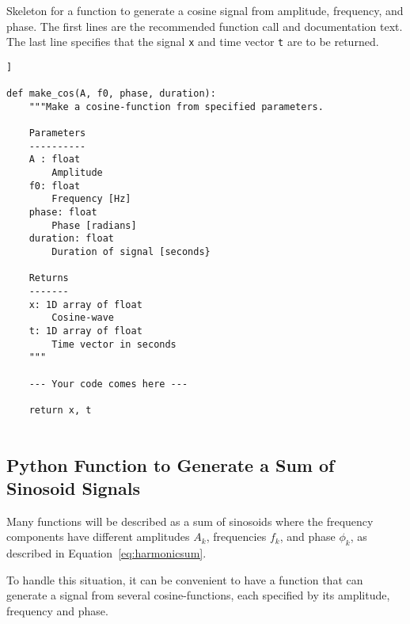 \begin{table}[h!]
	\caption{Skeleton for a function to generate a cosine signal from amplitude, frequency, and phase.
	The first lines are the recommended function call and documentation text. The last line specifies that the signal \texttt{x} and time vector \texttt{t} are to be returned. }
	\label{tab:make-cos}
\begin{lstlisting}[style=pythonstyle]]

def make_cos(A, f0, phase, duration):
	"""Make a cosine-function from specified parameters.
	
	Parameters
	----------
	A : float
		Amplitude
	f0: float
		Frequency [Hz]
	phase: float
		Phase [radians]
	duration: float
		Duration of signal [seconds}
	
	Returns
	-------
	x: 1D array of float
		Cosine-wave
	t: 1D array of float
		Time vector in seconds
	"""
	
	--- Your code comes here ---
	
	return x, t
		
\end{lstlisting}
\end{table}

\subsection{Python Function to Generate a Sum of Sinosoid Signals}
Many functions will be described as a sum of sinosoids where the frequency components have different amplitudes $A_k$, frequencies $f_k$, and phase $\phi_k$, as described in Equation~\eqref{eq:harmonicsum}.

To handle this situation, it can be convenient to have a function that can generate a signal from several cosine-functions, each specified by its amplitude, frequency and phase.

